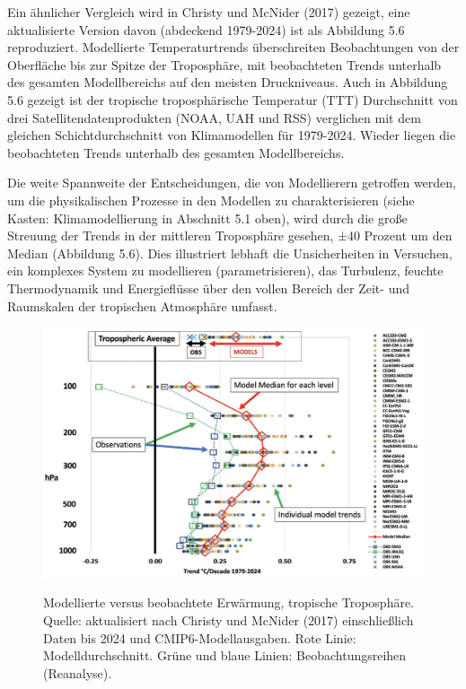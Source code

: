\documentclass[12pt,paper=a4,DIV=12,parskip=never,chapterprefix=false,headings=standardclasses]{scrreprt}
\begin{document}
Ein ähnlicher Vergleich wird in Christy und McNider (2017) gezeigt, eine aktualisierte Version davon (abdeckend 1979-2024) ist als Abbildung 5.6 reproduziert. Modellierte Temperaturtrends überschreiten Beobachtungen von der Oberfläche bis zur Spitze der Troposphäre, mit beobachteten Trends unterhalb des gesamten Modellbereichs auf den meisten Druckniveaus. Auch in Abbildung 5.6 gezeigt ist der tropische troposphärische Temperatur (TTT) Durchschnitt von drei Satellitendatenprodukten (NOAA, UAH und RSS) verglichen mit dem gleichen Schichtdurchschnitt von Klimamodellen für 1979-2024. Wieder liegen die beobachteten Trends unterhalb des gesamten Modellbereichs.

Die weite Spannweite der Entscheidungen, die von Modellierern getroffen werden, um die physikalischen Prozesse in den Modellen zu charakterisieren (siehe Kasten: Klimamodellierung in Abschnitt 5.1 oben), wird durch die große Streuung der Trends in der mittleren Troposphäre gesehen, ±40 Prozent um den Median (Abbildung 5.6). Dies illustriert lebhaft die Unsicherheiten in Versuchen, ein komplexes System zu modellieren (parametrisieren), das Turbulenz, feuchte Thermodynamik und Energieflüsse über den vollen Bereich der Zeit- und Raumskalen der tropischen Atmosphäre umfasst.

\begin{figure}[H]
\begin{center}
\includegraphics[width=1.0\textwidth]{bilder/bilderKlima-0030.jpg}\\[1cm]
\end{center}
\caption{Modellierte versus beobachtete Erwärmung, tropische Troposphäre. Quelle: aktualisiert
nach Christy und McNider (2017) einschließlich Daten bis 2024 und CMIP6-Modellausgaben.
Rote Linie: Modelldurchschnitt. Grüne und blaue Linien: Beobachtungsreihen (Reanalyse).}
\end{figure}
\end{document}
